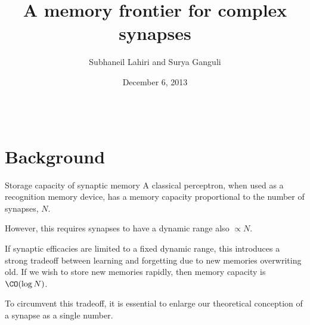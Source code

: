 \documentclass[final,hyperref={pdfpagelabels=false,bookmarks=false}]{beamer}
\title{A memory frontier for complex synapses}
\author{Subhaneil Lahiri and Surya Ganguli}
\institute[Stanford]{%
Department of Applied Physics, Stanford University, Stanford CA
}
\date{December 6, 2013}
\begin{document}
\begin{frame}{}

\begin{columns}[t]


\begin{column}{0.36\linewidth}

\section{Background}


\begin{block}{Storage capacity of synaptic memory}
%
%
 A classical perceptron, when used as a recognition memory device, has a memory capacity proportional to the number of synapses, $N$.

 \vp However, this requires synapses to have a dynamic range also $\propto N$.

 \vp If synaptic efficacies are limited to a fixed dynamic range, this introduces a strong tradeoff between learning and forgetting due to new memories overwriting old.
 If we wish to store new memories rapidly, then memory capacity is $\CO(\log N)$.
 \\ 

 \vp To circumvent this tradeoff, it is essential to enlarge our theoretical conception of a synapse as a single number.
\end{block}



\end{column}
\end{columns}
\end{frame}
\end{document}
